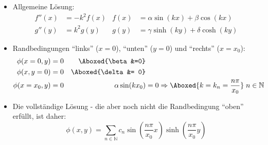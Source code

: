 \begin{frame}
  \begin{itemize}[<+->]
  \item Allgemeine Lösung:
    \begin{align*}
      f''(x) & = - k^2 f(x) & f(x) &= \alpha \sin(kx) + \beta \cos(kx) \\
      g''(y) & = k^2 g(y) & g(y) &= \gamma\sinh(ky) + \delta\cosh(ky)
    \end{align*}
  \item Randbedingungen \enquote{links} ($x=0$), \enquote{unten} ($y=0$) und \enquote{rechts} ($x=x_0$):
    \begin{align*}
      \phi(x=0,y) &= 0 & \Aboxed{\beta &=0} \\
      \phi(x,y=0) &=0 & \Aboxed{\delta &= 0} \\
      \phi(x=x_0, y) &= 0 & \alpha\sin(kx_0) &= 0 \Rightarrow \Aboxed{k=k_n=\frac{n\pi}{x_0}}\;n\in\mathbb{N} 
    \end{align*}
  \item Die vollständige Lösung - die aber noch nicht die Randbedingung \enquote{oben} erfüllt, ist daher:
    $$
    \phi(x,y) = \sum_{n\in\mathbb{N}} c_n \sin\left( \frac{n\pi}{x_0} x \right) \sinh\left( \frac{n\pi}{x_0} y \right)
    $$
  \end{itemize}
\end{frame}

